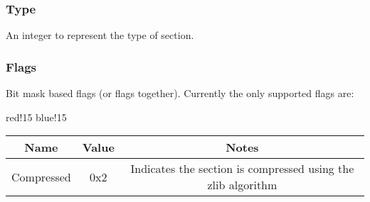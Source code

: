 \subsubsection{Type}
An integer to represent the type of section.

\subsubsection{Flags}
Bit mask based flags (or flags together). Currently the only supported flags are:
\begin{center}
    {
        {red!15}
        {blue!15}
        \begin{tabular}{|c|c|c|}
            \hline
            \textbf{Name} & \textbf{Value} & \textbf{Notes} \\
    
            \hline\hline
            Compressed & 0x2 & Indicates the section is compressed using the zlib \cite{zlib} algorithm \\
            \hline
        \end{tabular}
    }
\end{center}